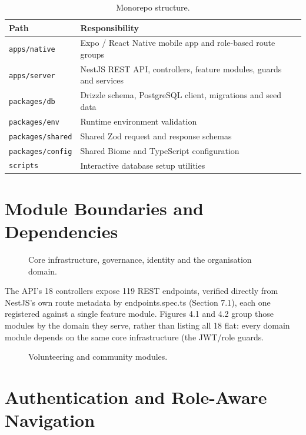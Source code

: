 \begin{table}[H]\centering
\caption{Monorepo structure.}
\label{tab:monorepo}
\begin{tabularx}{\textwidth}{|p{}|X|}
\hline
\textbf{Path} & \textbf{Responsibility}\\\hline
\texttt{apps/native} & Expo / React Native mobile app and role-based route groups\\\hline
\texttt{apps/server} & NestJS REST API, controllers, feature modules, guards and services\\\hline
\texttt{packages/db} & Drizzle schema, PostgreSQL client, migrations and seed data\\\hline
\texttt{packages/env} & Runtime environment validation\\\hline
\texttt{packages/shared} & Shared Zod request and response schemas\\\hline
\texttt{packages/config} & Shared Biome and TypeScript configuration\\\hline
\texttt{scripts} & Interactive database setup utilities\\\hline
\end{tabularx}
\end{table}

\section{Module Boundaries and Dependencies}
\label{sec:modules}


\begin{figure}[H]
    \centering
    \caption{Core infrastructure, governance, identity and the organisation domain.}
    \label{fig:modules-a}
\end{figure}
The API’s 18 controllers expose 119 REST endpoints, verified directly from NestJS’s own
route metadata by endpoints.spec.ts (Section 7.1), each one registered against a single
feature module. Figures 4.1 and 4.2 group those modules by the domain they serve, rather
than listing all 18 flat: every domain module depends on the same core infrastructure (the
JWT/role guards.

\begin{figure}[H]
    \centering
    \caption{Volunteering and community modules.}
    \label{fig:modules-b}
\end{figure}

\section{Authentication and Role-Aware Navigation}
\label{sec:impl-auth}


